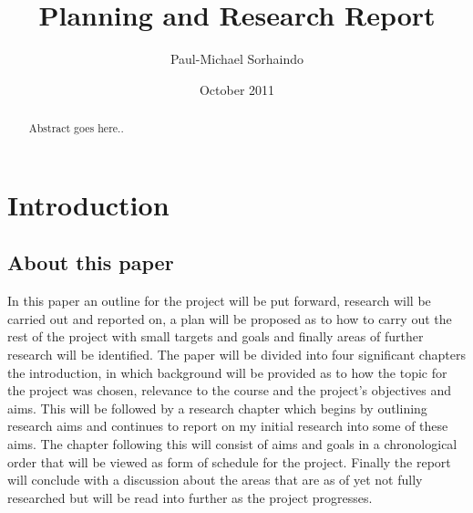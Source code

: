 \documentclass{report}
\begin{document}
\title {Planning and Research Report}
\author {Paul-Michael Sorhaindo}
\date {October 2011}

\begin{abstract}
Abstract goes here..
\end{abstract}


\chapter{Introduction}
\section{About this paper}
In this paper an outline for the project will be put forward, research will be carried out and reported on, a plan will be proposed as to how to carry out the rest of the project with small targets and goals and finally areas of further research will be identified. The paper will be divided into four significant chapters the introduction, in which background will be provided as to how the topic for the project was chosen, relevance to the course and the project's objectives and aims. This will be followed by a research chapter which begins by outlining research aims and continues to report on my initial research into some of these aims. The chapter following this will consist of aims and goals in a chronological order that will be viewed as form of schedule for the project. Finally the report will conclude with a discussion about the areas that are as of yet not fully researched but will be read into further as the project progresses.
\end{document}
